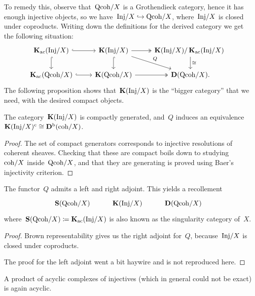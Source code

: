 \documentclass[10pt,a4paper]{article}
\begin{document}
To remedy this, observe that~$\mathrm{Qcoh}/X$ is a Grothendieck category, hence it has enough injective objects, so we have~$\mathrm{Inj}/X\hookrightarrow\mathrm{Qcoh}/X$, where~$\mathrm{Inj}/X$ is closed under coproducts. Writing down the definitions for the derived category we get the following situation:
\begin{equation}
  \begin{tikzcd}
    \KKK_\ac(\Inj/X) \arrow[hook]{r} \arrow[hook]{d} & \KKK(\Inj/X) \arrow[hook]{d} \arrow[two heads]{r} \arrow{rd}{Q} & \KKK(\Inj/X)/\KKK_\ac(\Inj/X) \arrow{d}{\cong} \\
    \KKK_\ac(\Qcoh/X) \arrow[hook]{r} & \KKK(\Qcoh/X) \arrow[two heads]{r} & \derived(\Qcoh/X).
  \end{tikzcd}
\end{equation}
The following proposition shows that~$\operatorname{\mathbf{K}}(\mathrm{Inj}/X)$ is the ``bigger category'' that we need, with the desired compact objects.
\begin{proposition}
  The category~$\operatorname{\mathbf{K}}(\mathrm{Inj}/X)$ is compactly generated, and~$Q$ induces an equivalence~$\operatorname{\mathbf{K}}(\mathrm{Inj}/X)^{\mathrm{c}}\cong\mathbf{D}^{\mathrm{b}}(\mathrm{coh}/X)$.
  \begin{proof}
    The set of compact generators corresponds to injective resolutions of coherent sheaves. Checking that these are compact boils down to studying~$\mathrm{coh}/X$ inside~$\mathrm{Qcoh}/X$, and that they are generating is proved using Baer's injectivity criterion.
  \end{proof}
\end{proposition}
\begin{theorem}
  The functor~$Q$ admits a left and right adjoint. This yields a recollement%
  \begin{equation}
    \begin{tikzcd}
      \SSing(\Qcoh/X) & \KKK(\Inj/X) & \derived(\Qcoh/X)
    \end{tikzcd}
  \end{equation}
  where~$\operatorname{\mathbf{S}}(\mathrm{Qcoh}/X)\coloneqq\operatorname{\mathbf{K}}_{\mathrm{ac}}(\mathrm{Inj}/X)$ is also known as the singularity category of~$X$.

  \begin{proof}
    Brown representability gives us the right adjoint for~$Q$, because~$\mathrm{Inj}/X$ is closed under coproducts.

    The proof for the left adjoint went a bit haywire and is not reproduced here.
  \end{proof}
\end{theorem}

\begin{corollary}
  A product of acyclic complexes of injectives (which in general could not be exact) is again acyclic.
\end{corollary}
\end{document}
